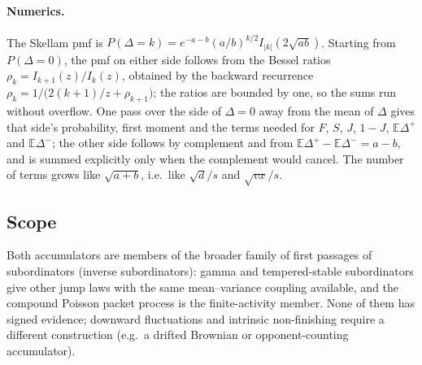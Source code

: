 \documentclass[12pt]{article}
\begin{document}
\paragraph{Numerics.}
The Skellam pmf is $P(\Delta=k)=e^{-a-b}(a/b)^{k/2}I_{|k|}(2\sqrt{ab})$. Starting from $P(\Delta=0)$, the pmf on either side follows from the Bessel ratios $\rho_k=I_{k+1}(z)/I_k(z)$, obtained by the backward recurrence $\rho_k=1/\big(2(k+1)/z+\rho_{k+1}\big)$; the ratios are bounded by one, so the sums run without overflow. One pass over the side of $\Delta=0$ away from the mean of $\Delta$ gives that side's probability, first moment and the terms needed for $F$, $S$, $J$, $1-J$, $\mathbb E\Delta^+$ and $\mathbb E\Delta^-$; the other side follows by complement and from $\mathbb E\Delta^+-\mathbb E\Delta^-=a-b$, and is summed explicitly only when the complement would cancel. The number of terms grows like $\sqrt{a+b}$, i.e.\ like $\sqrt{d}/s$ and $\sqrt{vx}/s$.

\subsection{Scope}
Both accumulators are members of the broader family of first passages of subordinators (inverse subordinators): gamma and tempered-stable subordinators give other jump laws with the same mean--variance coupling available, and the compound Poisson packet process is the finite-activity member. None of them has signed evidence; downward fluctuations and intrinsic non-finishing require a different construction (e.g.\ a drifted Brownian or opponent-counting accumulator).
\end{document}
